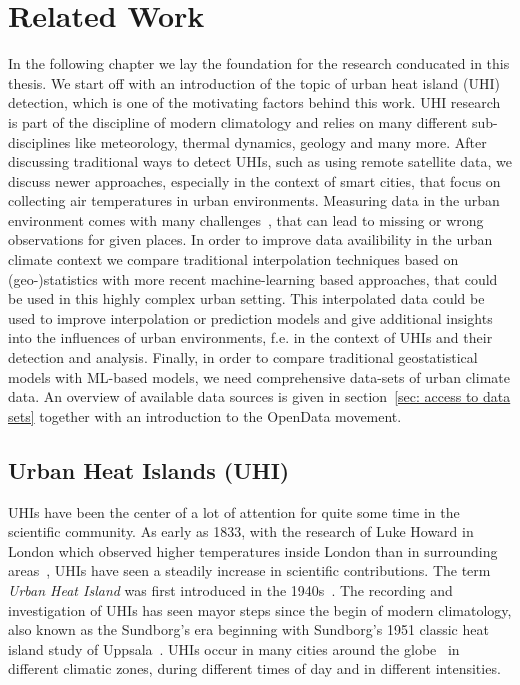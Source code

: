 \chapter{Related Work}
\label{chap:Related Work}

In the following chapter we lay the foundation for the research conducated in this thesis. We start off with an introduction of the topic of urban heat island (UHI) detection, which is one of the motivating factors behind this work. UHI research is part of the discipline of modern climatology and relies on many different sub-disciplines like meteorology, thermal dynamics, geology and many more.
After discussing traditional ways to detect UHIs, such as using remote satellite data, we discuss newer approaches, especially in the context of smart cities, that focus on collecting air temperatures in urban environments. Measuring data in the urban environment comes with many challenges~\cite{oke2006guideline}, that can lead to missing or wrong observations for given places.
In order to improve data availibility in the urban climate context we compare traditional interpolation techniques based on (geo-)statistics with more recent machine-learning based approaches, that could be used in this highly complex urban setting. This interpolated data could be used to improve interpolation or prediction models and give additional insights into the influences of urban environments, f.e. in the context of UHIs and their detection and analysis.
Finally, in order to compare traditional geostatistical models with ML-based models, we need comprehensive data-sets of urban climate data. An overview of available data sources is given in section~\ref{sec: access to data sets} together with an introduction to the OpenData movement.

\section{Urban Heat Islands (UHI)}

UHIs have been the center of a lot of attention for quite some time in the scientific community. As early as 1833, with the research of Luke Howard in London which observed higher temperatures inside London than in surrounding areas~\cite{howard1833climate}, UHIs have seen a steadily increase in scientific contributions. The term \textit{Urban Heat Island} was first introduced in the 1940s~\cite{balchin1947micro}. The recording and investigation of UHIs has seen mayor steps since the begin of modern climatology, also known as the Sundborg's era beginning with Sundborg's 1951 classic heat island study of Uppsala~\cite{sundborg1951climatological}. UHIs occur in many cities around the globe~\cite{peng2012surface} in different climatic zones, during different times of day and in different intensities.\\

